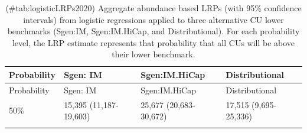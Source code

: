 \documentclass[
]{article}
\begin{document}
\begin{longtable}[]{@{}llll@{}}
\caption{(\#tab:logisticLRPs2020) Aggregate abundance based LRPs (with
95\% confidence intervals) from logistic regressions applied to three
alternative CU lower benchmarks (Sgen:IM, Sgen:IM.HiCap, and
Distributional). For each probability level, the LRP estimate represents
that probability that all CUs will be above their lower
benchmark.}\tabularnewline
\toprule
\begin{minipage}[b]{0.17\columnwidth}\raggedright
Probability\strut
\end{minipage} & \begin{minipage}[b]{0.22\columnwidth}\raggedright
Sgen: IM\strut
\end{minipage} & \begin{minipage}[b]{0.22\columnwidth}\raggedright
Sgen:IM.HiCap\strut
\end{minipage} & \begin{minipage}[b]{0.22\columnwidth}\raggedright
Distributional\strut
\end{minipage}\tabularnewline
\midrule
\endfirsthead
\toprule
\begin{minipage}[b]{0.17\columnwidth}\raggedright
Probability\strut
\end{minipage} & \begin{minipage}[b]{0.22\columnwidth}\raggedright
Sgen: IM\strut
\end{minipage} & \begin{minipage}[b]{0.22\columnwidth}\raggedright
Sgen:IM.HiCap\strut
\end{minipage} & \begin{minipage}[b]{0.22\columnwidth}\raggedright
Distributional\strut
\end{minipage}\tabularnewline
\midrule
\endhead
\begin{minipage}[t]{0.17\columnwidth}\raggedright
50\%\strut
\end{minipage} & \begin{minipage}[t]{0.22\columnwidth}\raggedright
15,395 (11,187-19,603)\strut
\end{minipage} & \begin{minipage}[t]{0.22\columnwidth}\raggedright
25,677 (20,683-30,672)\strut
\end{minipage} & \begin{minipage}[t]{0.22\columnwidth}\raggedright
17,515 (9,695-25,336)\strut
\end{minipage}\tabularnewline
\begin{minipage}[t]{0.17\columnwidth}\raggedright

\end{minipage}
\end{longtable}
\end{document}
